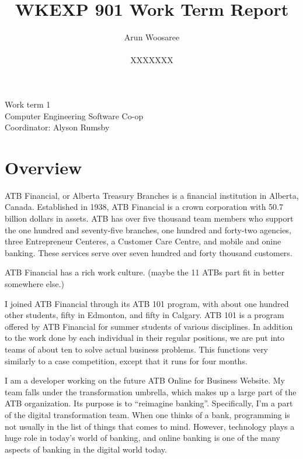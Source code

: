 \documentclass[letterpaper,12pt]{article}
\title{WKEXP 901 Work Term Report}
\author{Arun Woosaree \\ \\  XXXXXXX}
\begin{document}
\begin{titlepage}
 \maketitle
 \thispagestyle{empty}
 \centering
 \large
 \vspace{1cm}
 Work term 1\\
 \vspace{1cm}
 Computer Engineering Software Co-op \\
 \vspace{1cm}
 Coordinator: Alyson Rumsby
\end{titlepage}

\section{Overview}

ATB Financial, or Alberta Treasury Branches is a financial institution in Alberta, Canada.
Established in 1938, ATB Financial is a crown corporation with 50.7 billion dollars in assets.\cite{annualreport2018}
ATB has over five thousand team members who support the one hundred and seventy-five branches, one hundred and forty-two
agencies, three Entrepreneur Centeres, a Customer Care Centre, and mobile and onine banking.
These services serve over seven hundred and forty thousand customers. \cite{annualreport2018, annualreport2017}

ATB Financial has a rich work culture. (maybe the 11 ATBs part fit in better somewhere else.)

I joined ATB Financial through its ATB 101 program, with about one hundred other students,
fifty in Edmonton, and fifty in Calgary. ATB 101 is a program offered by ATB Financial
for summer students of various disciplines. In addition to the work done by each individual
in their regular positions, we are put into teams of about ten to solve actual business problems.
This functions very similarly to a case competition, except that it runs for four months.

I am a developer working on the future ATB Online for Business Website. My team falls under the
transformation umbrella, which
makes up a large part of the ATB organization. Its purpose is to ``reimagine banking''.
Specifically, I'm a part of the digital transformation team. When one thinks of a bank,
programming is not usually in the list of things that comes to mind. However, technology
plays a huge role in today's world of banking, and online banking is one of the many
aspects of banking in the digital world today.
\end{document}
